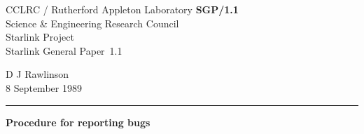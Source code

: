 \documentclass[twoside,11pt]{article}
\newcommand{\stardoccategory}  {Starlink General Paper}
\newcommand{\stardocinitials}  {SGP}
\newcommand{\stardocnumber}    {1.1}
\newcommand{\stardocauthors}   {D J Rawlinson}
\newcommand{\stardocdate}      {8 September 1989}
\newcommand{\stardoctitle}     {Procedure for reporting bugs}
\newcommand{\stardocname}{\stardocinitials /\stardocnumber}
\newenvironment{latexonly}{}{}
\begin{document}
\thispagestyle{empty}

\begin{latexonly}
   CCLRC / {\sc Rutherford Appleton Laboratory} \hfill {\bf \stardocname}\\
   {\large Science \& Engineering Research Council}\\
   {\large Starlink Project\\}
   {\large \stardoccategory\ \stardocnumber}
   \begin{flushright}
   \stardocauthors\\
   \stardocdate
   \end{flushright}
   \vspace{-4mm}
   \rule{\textwidth}{0.5mm}
   \vspace{5mm}
   \begin{center}
   {\Large\bf \stardoctitle}
   \end{center}
   \vspace{5mm}

\end{latexonly}
\end{document}
